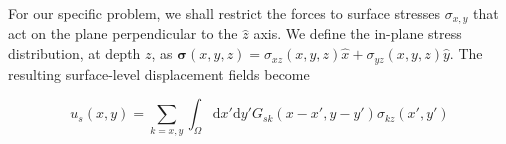 \documentclass[aps,prl,reprint,twocolumn,groupedaddress,showpacs]{revtex4-1}
\def\dd{\mbox{d}}
\def\r{{\bf r}}
\def\u{{\bf u}}
\def\F{{\bf F}}
\def\F{{\bf F}}
\newcommand{\bs}{\boldsymbol{\sigma}}
\begin{document}
%
%
%
% 
% 
%
For our specific problem, we shall restrict the forces to surface
stresses $\sigma_{x,y}$ that act on the plane perpendicular to the
$\hat{z}$ axis. We define the in-plane stress distribution, at depth $z$, as
$\bs(x,y,z) = \sigma_{xz}(x,y,z)\hat{x} + \sigma_{yz}(x,y,z)\hat{y}$. 
The resulting surface-level displacement fields become

\begin{equation}
u_{s}(x,y) = \sum_{k=x,y}\int_\Omega \dd x'\dd y'G_{sk}(x-x',y-y')\sigma_{kz}(x',y') 
\label{eq:UMODEL1s}
\end{equation}
\end{document}
